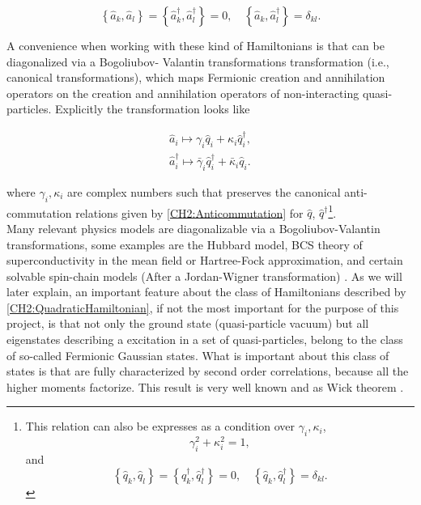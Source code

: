 \begin{equation}
\left\{\hat{a}_{k}, \hat{a}_{l}\right\}=\left\{\hat{a}_{k}^{\dagger}, \hat{a}_{l}^{\dagger}\right\}=0, \quad\left\{\hat{a}_{k}, \hat{a}_{l}^{\dagger}\right\}=\delta_{k l}.
\label{CH2:Anticommutation}
\end{equation}

\indent A convenience when working with these kind of Hamiltonians is that can be diagonalized via a Bogoliubov- Valantin transformations transformation (i.e., canonical transformations), which maps Fermionic creation and annihilation operators on the creation and annihilation operators of non-interacting quasi-particles\cite{berezin_method_1966,bogoljubov_new_1958}. Explicitly the transformation looks like

\begin{equation}
\begin{array}{c}
\hat{a}_{i} \mapsto \gamma_{i} \hat{q}_{i}+\kappa_{i} \hat{q}_{i}^{\dagger}, \\
\hat{a}_{i}^{\dagger} \mapsto \bar{\gamma}_{i} \hat{q}_{i}^{\dagger}+\bar{\kappa}_{i} \hat{q}_{i}.
\end{array}
\label{CH2:Bogoliuvov}
\end{equation}

where $\gamma_i , \kappa_i$ are complex numbers such that preserves the canonical anti-commutation relations given by \eqref{CH2:Anticommutation} for $\hat{q}$, $\hat{q}^{\dagger}$\footnote{This relation can also be expresses as a condition over $\gamma_i , \kappa_i$,
\[ \gamma_i ^2+ \kappa_i^2 = 1,\]
and 
\[\left\{\hat{q}_{k}, \hat{q}_{l}\right\}=\left\{\hat{q}_{k}^{\dagger}, \hat{q}_{l}^{\dagger}\right\}=0, \quad\left\{\hat{q}_{k}, \hat{q}_{l}^{\dagger}\right\}=\delta_{k l}.\]
 }.\\

\indent Many relevant physics models are diagonalizable via a Bogoliubov-Valantin transformations, some examples are the Hubbard model, BCS theory of superconductivity in the mean field or Hartree-Fock approximation, and certain solvable spin-chain models (After a Jordan-Wigner transformation) \cite{fradkin_field_1997}. As we will later explain, an important feature about the class of Hamiltonians described by \eqref{CH2:QuadraticHamiltonian}, if not the most important for the purpose of this project,  is that not only the ground state (quasi-particle vacuum)  but all eigenstates describing a excitation  in a set of quasi-particles, belong to the class of so-called Fermionic Gaussian states\cite{botero_bcs-like_2004}. What is important about this class of states is that are fully characterized by second order correlations, because all the higher moments factorize. This result is very well known and as Wick theorem \cite{westwanski_general_1973,molinari_notes_2017}.
